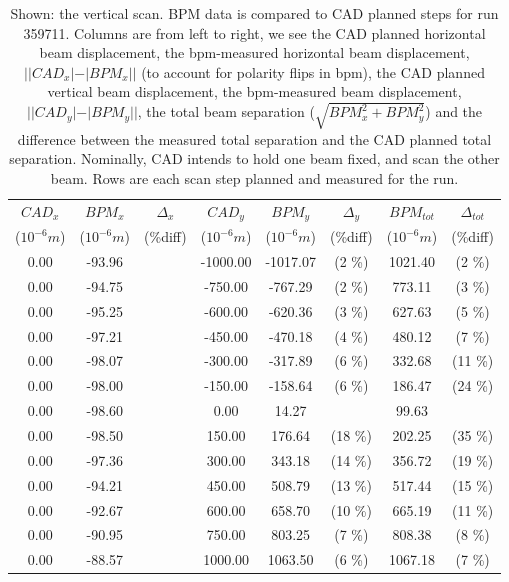 \begin{table}[ht]
  \centering
  \begin{tabular}{c c c c c c c c}
    \toprule
    \textbf{$CAD_{x}$} & \textbf{$BPM_{x}$ } & \textbf{$\Delta_{x}$} &\textbf{$CAD_{y}$} & \textbf{$BPM_{y}$} & \textbf{$\Delta_{y}$} & \textbf{$BPM_{tot}$} & \textbf{$\Delta_{tot}$} \\
    ($10^{-6} m$) & ($10^{-6} m$) & (\%diff) & ($10^{-6} m$) & ($10^{-6} m$) & (\%diff) & ($10^{-6} m$) & (\%diff) \\
    \midrule
    0.00 & -93.96 &  & -1000.00 & -1017.07 &  (2 \%) & 1021.40 &  (2 \%)\\
    0.00 & -94.75 &  & -750.00 & -767.29 &  (2 \%) & 773.11 &  (3 \%)\\
    0.00 & -95.25 &  & -600.00 & -620.36 &  (3 \%) & 627.63 &  (5 \%)\\
    0.00 & -97.21 &  & -450.00 & -470.18 &  (4 \%) & 480.12 &  (7 \%)\\
    0.00 & -98.07 &  & -300.00 & -317.89 &  (6 \%) & 332.68 &  (11 \%)\\
    0.00 & -98.00 &  & -150.00 & -158.64 &  (6 \%) & 186.47 &  (24 \%)\\
    0.00 & -98.60 &  & 0.00 & 14.27 &  & 99.63 & \\
    0.00 & -98.50 &  & 150.00 & 176.64 &  (18 \%) & 202.25 &  (35 \%)\\
    0.00 & -97.36 &  & 300.00 & 343.18 &  (14 \%) & 356.72 &  (19 \%)\\
    0.00 & -94.21 &  & 450.00 & 508.79 &  (13 \%) & 517.44 &  (15 \%)\\
    0.00 & -92.67 &  & 600.00 & 658.70 &  (10 \%) & 665.19 &  (11 \%)\\
    0.00 & -90.95 &  & 750.00 & 803.25 &  (7 \%) & 808.38 &  (8 \%)\\
    0.00 & -88.57 &  & 1000.00 & 1063.50 &  (6 \%) & 1067.18 &  (7 \%)\\
    \bottomrule
  \end{tabular}
  \caption{ 
    Shown: the vertical scan. BPM data is compared to CAD planned steps for run
    359711.  Columns are from left to right, we see the CAD planned horizontal
    beam displacement, the bpm-measured horizontal beam displacement,
    $||CAD_{x}| - |BPM_{x}||$ (to account for polarity flips in bpm), the CAD
    planned vertical beam displacement, the bpm-measured beam displacement,
    $||CAD_{y}| - |BPM_{y}||$, the total beam separation
    ($\sqrt{BPM_{x}^2+BPM_{y}^2}$) and the difference between the measured total
    separation and the CAD planned total separation. Nominally, CAD intends to
    hold one beam fixed, and scan the other beam. Rows are each scan step
    planned and measured for the run. 
  }
  \label{fig:bpm_data_example_v}
\end{table}

